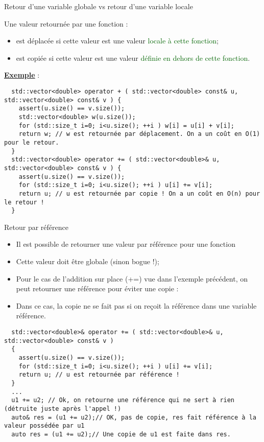 \documentclass[compress,10pt,aspectratio=169]{beamer}
\begin{document}
\begin{frame}[fragile]{Retour d'une variable globale vs retour d'une variable locale}
    \scriptsize
  
    \begin{block}{\small Une valeur retournée par une fonction :}
  \begin{itemize}
  \item \textcolor{BrickRed}{est déplacée} si cette valeur est une valeur \textcolor{DarkGreen}{locale à cette fonction};
  \item \textcolor{BrickRed}{est copiée} si cette valeur est une valeur \textcolor{DarkGreen}{définie en dehors de cette fonction}.
  \end{itemize}
    \end{block}
  
    \underline{\textbf{Exemple}} :
  
    \begin{verbatim}
  std::vector<double> operator + ( std::vector<double> const& u, std::vector<double> const& v ) {
    assert(u.size() == v.size());
    std::vector<double> w(u.size());
    for (std::size_t i=0; i<u.size(); ++i ) w[i] = u[i] + v[i];
    return w; // w est retournée par déplacement. On a un coût en O(1) pour le retour.
  }
  std::vector<double> operator += ( std::vector<double>& u, std::vector<double> const& v ) {
    assert(u.size() == v.size());
    for (std::size_t i=0; i<u.size(); ++i ) u[i] += v[i];
    return u; // u est retournée par copie ! On a un coût en O(n) pour le retour !
  }
  \end{verbatim}
  \end{frame}
  
  \begin{frame}[fragile]{Retour par référence}
  \scriptsize
  
  \begin{itemize}
  \item Il est possible de retourner une valeur par référence pour une fonction
  \item \alert{Cette valeur doit être globale} (sinon bogue !);
  \item Pour le cas de l'addition sur place (+=) vue dans l'exemple précédent, on peut retourner une référence pour éviter une copie :
  \item Dans ce cas, la copie ne se fait pas si on reçoit la référence dans une variable référence.
  \end{itemize}
  
  \begin{verbatim}
  std::vector<double>& operator += ( std::vector<double>& u, std::vector<double> const& v )
  {
    assert(u.size() == v.size());
    for (std::size_t i=0; i<u.size(); ++i ) u[i] += v[i];
    return u; // u est retournée par référence ! 
  }
  ... 
  u1 += u2; // Ok, on retourne une référence qui ne sert à rien (détruite juste après l'appel !)
  auto& res = (u1 += u2);// OK, pas de copie, res fait référence à la valeur possédée par u1
  auto res = (u1 += u2);// Une copie de u1 est faite dans res.
  \end{verbatim}
  \end{frame}
\end{document}
